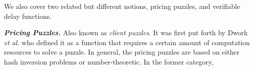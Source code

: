 


We also cover two related but different notions, pricing puzzles, and verifiable delay functions. 

\noindent\textbf{\textit{Pricing Puzzles.}} Also known as \emph{client puzzles}. It was first put forth by Dwork \textit{et al.} \cite{DworkN92} who defined it as a function that requires a certain amount of computation resources to solve a puzzle.  In general, the pricing puzzles are based on either hash inversion problems or number-theoretic. In the former category, 
